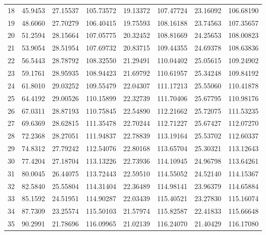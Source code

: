 \begin{table}[ht!]
{\begin{tabular}{@{}rrrrrrrr@{}}
18 & 45.9453 & 27.15537 & 105.73572 & 19.13372 & 107.47724 & 23.16092 & 106.68190 \\
19 & 48.6060 & 27.70279 & 106.40415 & 19.75593 & 108.16188 & 23.74563 & 107.35657 \\
20 & 51.2594 & 28.15664 & 107.05775 & 20.32452 & 108.81669 & 24.25653 & 108.00823 \\
21 & 53.9054 & 28.51954 & 107.69732 & 20.83715 & 109.44355 & 24.69378 & 108.63836 \\
22 & 56.5443 & 28.78792 & 108.32550 & 21.29491 & 110.04402 & 25.05615 & 109.24902 \\
23 & 59.1761 & 28.95935 & 108.94423 & 21.69792 & 110.61957 & 25.34248 & 109.84192 \\
24 & 61.8010 & 29.03252 & 109.55479 & 22.04307 & 111.17213 & 25.55060 & 110.41878 \\
25 & 64.4192 & 29.00526 & 110.15899 & 22.32739 & 111.70406 & 25.67795 & 110.98176 \\
26 & 67.0311 & 28.87193 & 110.75845 & 22.54890 & 112.21662 & 25.72075 & 111.53235 \\
27 & 69.6369 & 28.62815 & 111.35478 & 22.70244 & 112.71227 & 25.67427 & 112.07270 \\
28 & 72.2368 & 28.27051 & 111.94837 & 22.78839 & 113.19164 & 25.53702 & 112.60337 \\
29 & 74.8312 & 27.79242 & 112.54076 & 22.80168 & 113.65704 & 25.30321 & 113.12643 \\
30 & 77.4204 & 27.18704 & 113.13226 & 22.73936 & 114.10945 & 24.96798 & 113.64261 \\
31 & 80.0045 & 26.44075 & 113.72443 & 22.59510 & 114.55052 & 24.52140 & 114.15367 \\
32 & 82.5840 & 25.55804 & 114.31404 & 22.36489 & 114.98141 & 23.96379 & 114.65884 \\
33 & 85.1592 & 24.51951 & 114.90287 & 22.03439 & 115.40521 & 23.27830 & 115.16074 \\
34 & 87.7309 & 23.25574 & 115.50103 & 21.57974 & 115.82587 & 22.41833 & 115.66648 \\
35 & 90.2991 & 21.78696 & 116.09965 & 21.02139 & 116.24070 & 21.40429 & 116.17080 \\ \bottomrule
\end{tabular}%
}
\end{table}
\vfill
\clearpage

